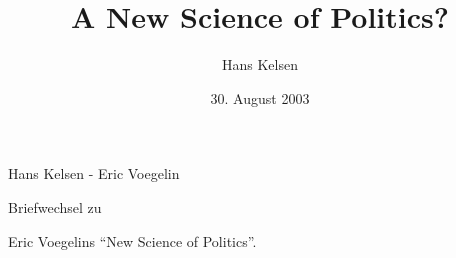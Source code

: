 \documentclass[12pt,a4paper,ngerman]{book}
\begin{document}
\selectlanguage{\ngerman}

\title{A New Science of Politics?}
\author{Hans Kelsen}

\date{30. August 2003}


\begin{titlepage}

\setlength{\parindent}{0em}


\begin{sf}

\setlength{\parskip}{7cm}

{\Huge Hans Kelsen - Eric Voegelin}

\setlength{\parskip}{3cm}

{\huge Briefwechsel zu }

\setlength{\parskip}{0.2cm}

{\huge Eric Voegelins "`New Science of Politics"'.}



\setlength{\parskip}{5cm}

\end{sf}

\end{titlepage}

\tableofcontents

\setcounter{page}{1}

%
%

%
\end{document}
